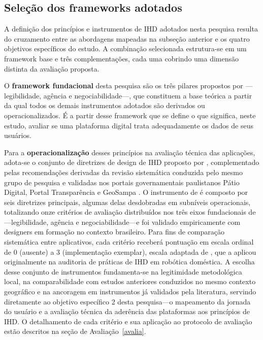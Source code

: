 \documentclass[
	12pt,				%
	oneside,			%
	a4paper,			%
	english,			%
	brazil				%
	]{abntex2ppgsi}
\begin{document}
    \subsection{Seleção dos frameworks adotados}

    A definição dos princípios e instrumentos de IHD adotados nesta pesquisa resulta do cruzamento entre as abordagens mapeadas na subseção anterior e os quatro objetivos específicos do estudo. A combinação selecionada estrutura-se em um framework base e três complementações, cada uma cobrindo uma dimensão distinta da avaliação proposta.

    O \textbf{framework fundacional} desta pesquisa são os três pilares propostos por ---legibilidade, agência e negociabilidade---, que constituem a base teórica a partir da qual todos os demais instrumentos adotados são derivados ou operacionalizados. É a partir desse framework que se define o que significa, neste estudo, avaliar se uma plataforma digital trata adequadamente os dados de seus usuários.

    Para a \textbf{operacionalização} desses princípios na avaliação técnica das aplicações, adota-se o conjunto de diretrizes de design de IHD proposto por , complementado 
    pelas recomendações derivadas da revisão sistemática conduzida pelo mesmo grupo de pesquisa e validadas nos portais governamentais paulistanos Pátio Digital, Portal Transparência e GeoSampa \cite{VICTORELLI2020Understanding}. O instrumento de  é composto por seis diretrizes principais, algumas delas desdobradas em subníveis operacionais, totalizando onze critérios de avaliação distribuídos nos três eixos fundacionais de 
    ---legibilidade, agência e negociabilidade---e foi validado empiricamente com designers em formação no contexto brasileiro. Para fins de comparação sistemática entre aplicativos, cada critério receberá pontuação em escala ordinal de 0 (ausente) a 3 (implementação exemplar), escala adaptada de , que a aplicou originalmente na auditoria de práticas de IHD em robótica doméstica. A escolha desse conjunto de instrumentos fundamenta-se na legitimidade metodológica local, na comparabilidade com estudos anteriores conduzidos no mesmo contexto geográfico e na ancoragem em instrumentos já validados pela literatura, servindo diretamente ao objetivo específico 2 desta pesquisa---o mapeamento da jornada do usuário e a avaliação técnica da aderência das plataformas aos princípios de IHD. O detalhamento de cada critério e sua aplicação ao protocolo de avaliação estão descritos na seção de Avaliação~\ref{avalia}.
\end{document}
